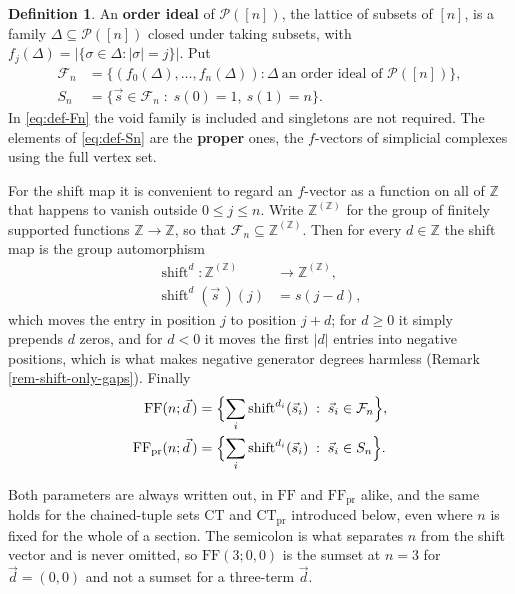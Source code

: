 \documentclass[11pt, a4paper, abstract=yes]{scrartcl}
\theoremstyle{definition}
\newtheorem{definition}{Definition}
\theoremstyle{remark}
\theoremstyle{plain}
\newcommand{\shift}{\operatorname{shift}}
\begin{document}
\begin{definition}
An \textbf{order ideal} of \(\mathcal P([n])\), the lattice of subsets of \([n]\), is a family
\(\Delta\subseteq\mathcal P([n])\) closed under taking subsets, with
\(f_j(\Delta)=|\lbrace\sigma\in\Delta:|\sigma|=j\rbrace|\). Put
\begin{align}
  \mathcal F_n &=\lbrace(f_0(\Delta),\dots,f_n(\Delta)):\Delta\ \text{an order ideal of }\mathcal P([n])\rbrace,
    \label{eq:def-Fn}\\
  S_n &=\lbrace \vec s\in\mathcal F_n\;:\;s(0)=1,\ s(1)=n\rbrace .
    \label{eq:def-Sn}
\end{align}
In \eqref{eq:def-Fn} the void family is included and singletons are not required. The elements of
\eqref{eq:def-Sn} are the \textbf{proper} ones, the \(f\)-vectors of simplicial complexes using the full
vertex set.

For the shift map it is convenient to regard an \(f\)-vector as a function on all of \(\mathbb Z\)
that happens to vanish outside \(0\le j\le n\). Write \(\mathbb Z^{(\mathbb Z)}\) for the group of
finitely supported functions \(\mathbb Z\to\mathbb Z\), so that
\(\mathcal F_n\subseteq\mathbb Z^{(\mathbb Z)}\). Then for every \(d\in\mathbb Z\) the shift map
is the group automorphism
\begin{equation}\label{eq:def-shift}
\begin{split}
  \shift^d\colon\mathbb Z^{(\mathbb Z)} &\longrightarrow \mathbb Z^{(\mathbb Z)},\\
  \shift^d(\vec s\,)(j) &= s(j-d),
\end{split}
\end{equation}
which moves the entry in position \(j\) to position \(j+d\); for \(d\ge0\) it simply prepends
\(d\) zeros, and for \(d<0\) it moves the first \(\lvert d\rvert\) entries into negative
positions, which is what makes negative generator degrees harmless
(Remark \ref{rem-shift-only-gaps}). Finally
\begin{align}
  \mathrm{FF}(n;\vec d\,)&=\Bigl\lbrace\sum_i\shift^{d_i}(\vec s_i)\;:\;\vec s_i\in\mathcal F_n\Bigr\rbrace,
    \label{eq:def-FF}\\
  \mathrm{FF}_{\mathrm{pr}}(n;\vec d\,)&=\Bigl\lbrace\sum_i\shift^{d_i}(\vec s_i)\;:\;\vec s_i\in S_n\Bigr\rbrace .
    \label{eq:def-FFpr}
\end{align}

Both parameters are always written out, in \(\mathrm{FF}\) and \(\mathrm{FF}_{\mathrm{pr}}\)
alike, and the same holds for the chained-tuple sets \(\mathrm{CT}\) and
\(\mathrm{CT}_{\mathrm{pr}}\) introduced below, even where \(n\) is fixed for the whole of a
section. The semicolon is what separates \(n\) from the shift vector and is never omitted, so
\(\mathrm{FF}(3;0,0)\) is the sumset at \(n=3\) for \(\vec d=(0,0)\) and not a sumset for a
three-term \(\vec d\).
\label{def-fn}
\end{definition}
\end{document}
